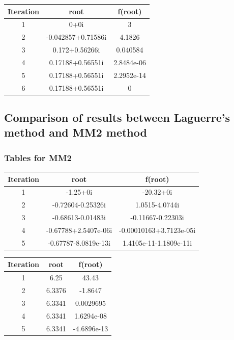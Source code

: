 \begin{center}
  \begin{tabular}{| c  c c |}
\hline
Iteration & root         & f(root) \\
\hline
1   &           0+0i           &           3 \\
\hline
2   &   -0.042857+0.71586i     &      4.1826 \\
\hline
3   &       0.172+0.56266i     &    0.040584 \\
\hline
4   &    0.17188+0.56551i     &  2.8484e-06 \\
\hline
5   &     0.17188+0.56551i    &   2.2952e-14 \\
\hline
6   &     0.17188+0.56551i    &            0 \\
\hline


\end{tabular}
\end{center}


\subsection{Comparison of results between Laguerre's method and MM2 method}

\subsubsection{Tables for MM2}

\begin{center}
  \begin{tabular}{| c  c c |}
\hline
Iteration & root         & f(root) \\
\hline
1  &       -1.25+0i         &         -20.32+0i    \\
\hline
2  &    -0.72604-0.25326i   &         1.0515-4.0744i  \\
\hline
3  &   -0.68613-0.01483i    &      -0.11667-0.22303i   \\
\hline
4  &   -0.67788+2.5407e-06i &   -0.00010163+3.7123e-05i \\
\hline
5  &    -0.67787-8.0819e-13i &    1.4105e-11-1.1809e-11i \\
\hline
 \hline

\end{tabular}
\end{center}

\begin{center}
  \begin{tabular}{| c  c c |}
\hline
Iteration & root         & f(root) \\
\hline
1   &     6.25    &       43.43 \\
\hline
2   &   6.3376    &     -1.8647 \\
\hline
3   &  6.3341     &  0.0029695 \\
\hline
4   &   6.3341    &  1.6294e-08 \\
\hline
5   &   6.3341    & -4.6896e-13 \\
\hline
\hline

\end{tabular}
\end{center}

